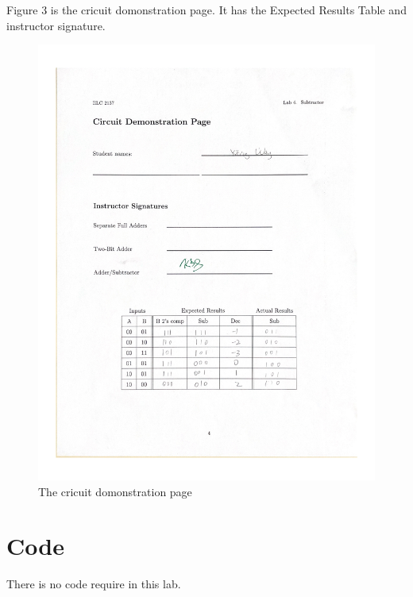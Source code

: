 \documentclass[11pt]{article}
\begin{document}
	Figure 3 is the cricuit domonstration page. It has the Expected Results Table and instructor signature.\\
	\begin{figure}[ht]\centering
		\includegraphics[width=1.0\textwidth]{Lab4Page}
		\caption{The cricuit domonstration page}
		\label{fig:Lab4Page}
	\end{figure}



\section*{Code}

	There is no code require in this lab.\\	
\end{document}
